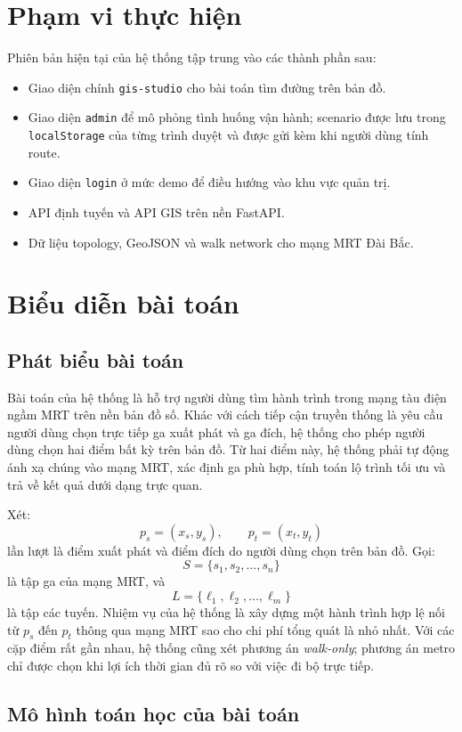 \documentclass[../DoAn.tex]{subfiles}
\begin{document}
\section{Phạm vi thực hiện}
Phiên bản hiện tại của hệ thống tập trung vào các thành phần sau:
\begin{itemize}
    \item Giao diện chính \texttt{gis-studio} cho bài toán tìm đường trên bản đồ.
    \item Giao diện \texttt{admin} để mô phỏng tình huống vận hành; scenario được lưu trong \texttt{localStorage} của từng trình duyệt và được gửi kèm khi người dùng tính route.
    \item Giao diện \texttt{login} ở mức demo để điều hướng vào khu vực quản trị.
    \item API định tuyến và API GIS trên nền FastAPI.
    \item Dữ liệu topology, GeoJSON và walk network cho mạng MRT Đài Bắc.
\end{itemize}


\section{Biểu diễn bài toán}

\subsection{Phát biểu bài toán}
Bài toán của hệ thống là hỗ trợ người dùng tìm hành trình trong mạng tàu điện ngầm MRT trên nền bản đồ số. Khác với cách tiếp cận truyền thống là yêu cầu người dùng chọn trực tiếp ga xuất phát và ga đích, hệ thống cho phép người dùng chọn hai điểm bất kỳ trên bản đồ. Từ hai điểm này, hệ thống phải tự động ánh xạ chúng vào mạng MRT, xác định ga phù hợp, tính toán lộ trình tối ưu và trả về kết quả dưới dạng trực quan.

Xét:
\[
p_s = (x_s, y_s), \qquad p_t = (x_t, y_t)
\]
lần lượt là điểm xuất phát và điểm đích do người dùng chọn trên bản đồ. Gọi:
\[
S = \{s_1, s_2, \dots, s_n\}
\]
là tập ga của mạng MRT, và
\[
L = \{\ell_1, \ell_2, \dots, \ell_m\}
\]
là tập các tuyến. Nhiệm vụ của hệ thống là xây dựng một hành trình hợp lệ nối từ $p_s$ đến $p_t$ thông qua mạng MRT sao cho chi phí tổng quát là nhỏ nhất. Với các cặp điểm rất gần nhau, hệ thống cũng xét phương án \textit{walk-only}; phương án metro chỉ được chọn khi lợi ích thời gian đủ rõ so với việc đi bộ trực tiếp.

\subsection{Mô hình toán học của bài toán}
\end{document}
